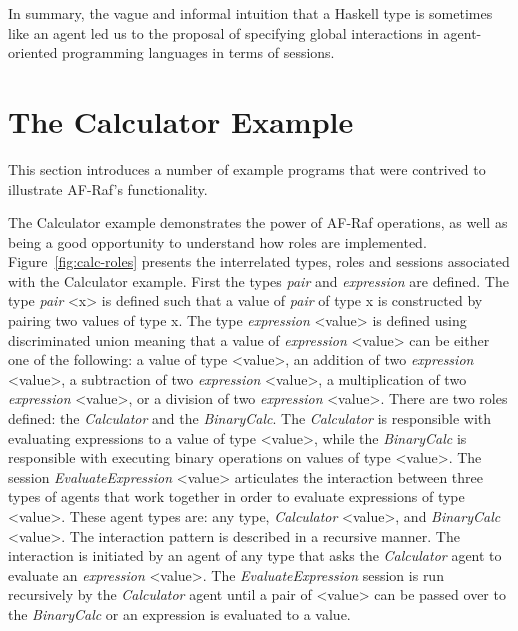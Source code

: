 \documentclass[a4paper,12pt,oneside,fleqn]{book} %
\begin{document}
In summary, the vague and informal intuition that a Haskell type is
sometimes like an agent led us to the proposal of specifying global
interactions in agent-oriented programming languages in terms of sessions.

\section{The Calculator Example} %

This section introduces a number of example programs that were contrived to
illustrate AF-Raf's functionality.

The Calculator example demonstrates the power of AF-Raf operations, as well
as being a good opportunity to understand how roles are implemented.
Figure~\ref{fig:calc-roles} presents the interrelated types, roles and
sessions associated with the Calculator example. First the types
\textit{pair} and \textit{expression} are defined. The type \textit{pair}
<x> is defined such that a value of \textit{pair} of type x is constructed
by pairing two values of type x. The type \textit{expression} <value> is
defined using discriminated union meaning that a value of
\textit{expression} <value> can be either one of the following: a value of
type <value>, an addition of two \textit{expression} <value>, a subtraction
of two \textit{expression} <value>, a multiplication of two
\textit{expression} <value>, or a division of two \textit{expression}
<value>. There are two roles defined: the \textit{Calculator} and the
\textit{BinaryCalc}. The \textit{Calculator} is responsible with evaluating
expressions to a value of type <value>, while the \textit{BinaryCalc} is
responsible with executing binary operations on values of type <value>. The
session \textit{EvaluateExpression} <value> articulates the interaction
between three types of agents that work together in order to evaluate
expressions of type <value>. These agent types are: any type,
\textit{Calculator} <value>, and \textit{BinaryCalc} <value>. The
interaction pattern is described in a recursive manner. The interaction is
initiated by an agent of any type that asks the \textit{Calculator} agent
to evaluate an \textit{expression} <value>. The \textit{EvaluateExpression}
session is run recursively by the \textit{Calculator} agent until a pair of
<value> can be passed over to the \textit{BinaryCalc} or an expression is
evaluated to a value.
\end{document}
